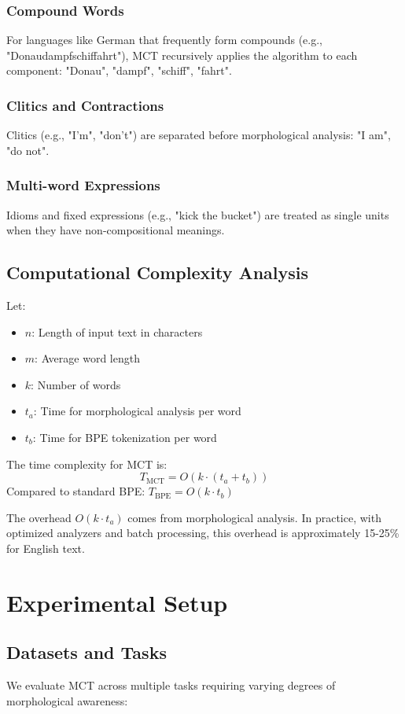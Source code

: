 \documentclass[conference]{IEEEtran}
\begin{document}
\subsubsection{Compound Words}
For languages like German that frequently form compounds (e.g., "Donaudampfschiffahrt"), MCT recursively applies the algorithm to each component: "Donau", "dampf", "schiff", "fahrt".

\subsubsection{Clitics and Contractions}
Clitics (e.g., "I'm", "don't") are separated before morphological analysis: "I am", "do not".

\subsubsection{Multi-word Expressions}
Idioms and fixed expressions (e.g., "kick the bucket") are treated as single units when they have non-compositional meanings.

\subsection{Computational Complexity Analysis}
Let:
\begin{itemize}
    \item $n$: Length of input text in characters
    \item $m$: Average word length
    \item $k$: Number of words
    \item $t_a$: Time for morphological analysis per word
    \item $t_b$: Time for BPE tokenization per word
\end{itemize}

The time complexity for MCT is:
\[
T_{\text{MCT}} = O(k \cdot (t_a + t_b))
\]
Compared to standard BPE: $T_{\text{BPE}} = O(k \cdot t_b)$

The overhead $O(k \cdot t_a)$ comes from morphological analysis. In practice, with optimized analyzers and batch processing, this overhead is approximately 15-25\% for English text.

\section{Experimental Setup}
\label{sec:experiments}

\subsection{Datasets and Tasks}
We evaluate MCT across multiple tasks requiring varying degrees of morphological awareness:
\end{document}
